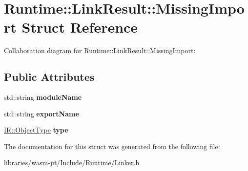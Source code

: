 \hypertarget{struct_runtime_1_1_link_result_1_1_missing_import}{}\section{Runtime\+:\+:Link\+Result\+:\+:Missing\+Import Struct Reference}
\label{struct_runtime_1_1_link_result_1_1_missing_import}


Collaboration diagram for Runtime\+:\+:Link\+Result\+:\+:Missing\+Import\+:
\subsection*{Public Attributes}
\begin{DoxyCompactItemize}
\item 
\mbox{\label{struct_runtime_1_1_link_result_1_1_missing_import_aed2d1900488c9cb9c347dd941695cfd6}} 
std\+::string {\bfseries module\+Name}
\item 
\mbox{\label{struct_runtime_1_1_link_result_1_1_missing_import_a9c94f294ff5fccb290adab23ddaf0785}} 
std\+::string {\bfseries export\+Name}
\item 
\mbox{\label{struct_runtime_1_1_link_result_1_1_missing_import_af23f523b5a6a6ecf55c7c12d6a5d0678}} 
\mbox{\hyperlink{struct_i_r_1_1_object_type}{I\+R\+::\+Object\+Type}} {\bfseries type}
\end{DoxyCompactItemize}


The documentation for this struct was generated from the following file\+:\begin{DoxyCompactItemize}
\item 
libraries/wasm-\/jit/\+Include/\+Runtime/Linker.\+h\end{DoxyCompactItemize}
